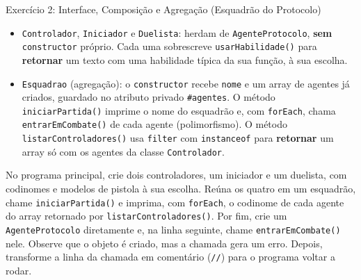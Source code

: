 \begin{exercicio}{Exercício 2: Interface, Composição e Agregação (Esquadrão do Protocolo)}
\begin{itemize}
    \item \texttt{Controlador}, \texttt{Iniciador} e \texttt{Duelista}: herdam de
    \texttt{AgenteProtocolo}, \textbf{sem} \texttt{constructor} próprio. Cada uma sobrescreve
    \texttt{usarHabilidade()} para \textbf{retornar} um texto com uma habilidade típica da sua
    função, à sua escolha.

    \item \texttt{Esquadrao} (agregação): o \texttt{constructor} recebe \texttt{nome} e um array
    de agentes já criados, guardado no atributo privado \texttt{\#agentes}. O método
    \texttt{iniciarPartida()} imprime o nome do esquadrão e, com \texttt{forEach}, chama
    \texttt{entrarEmCombate()} de cada agente (polimorfismo). O método
    \texttt{listarControladores()} usa \texttt{filter} com \texttt{instanceof} para
    \textbf{retornar} um array só com os agentes da classe \texttt{Controlador}.
\end{itemize}

No programa principal, crie dois controladores, um iniciador e um duelista, com codinomes e
modelos de pistola à sua escolha. Reúna os quatro em um esquadrão, chame
\texttt{iniciarPartida()} e imprima, com \texttt{forEach}, o codinome de cada agente do array
retornado por \texttt{listarControladores()}. Por fim, crie um \texttt{AgenteProtocolo}
diretamente e, na linha seguinte, chame \texttt{entrarEmCombate()} nele. Observe que o objeto é
criado, mas a chamada gera um erro. Depois, transforme a linha da chamada em comentário
(\texttt{//}) para o programa voltar a rodar.
\end{exercicio}

